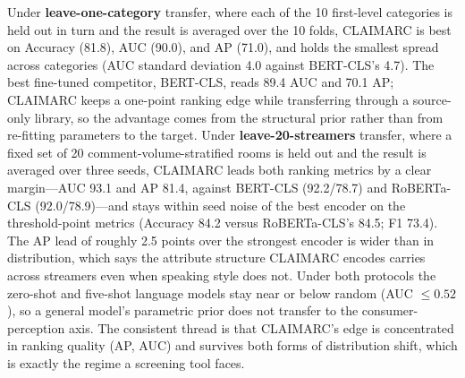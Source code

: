 \documentclass[11pt]{article}
\begin{document}
Under \textbf{leave-one-category} transfer, where each of the 10 first-level
categories is held out in turn and the result is averaged over the 10 folds,
CLAIMARC is best on Accuracy (81.8), AUC (90.0), and AP (71.0), and holds the
smallest spread across categories (AUC standard deviation 4.0 against
BERT-CLS's 4.7). The best fine-tuned competitor, BERT-CLS, reads 89.4 AUC and
70.1 AP; CLAIMARC keeps a one-point ranking edge while transferring through a
source-only library, so the advantage comes from the structural prior rather
than from re-fitting parameters to the target. Under
\textbf{leave-20-streamers} transfer, where a fixed set of 20
comment-volume-stratified rooms is held out and the result is averaged over
three seeds, CLAIMARC leads both ranking metrics by a clear margin---AUC 93.1
and AP 81.4, against BERT-CLS (92.2/78.7) and RoBERTa-CLS (92.0/78.9)---and stays
within seed noise of the best encoder on the threshold-point metrics (Accuracy
84.2 versus RoBERTa-CLS's 84.5; F1 73.4). The AP lead of roughly 2.5 points over
the strongest encoder is wider than in distribution, which says the attribute
structure CLAIMARC encodes carries across streamers even when speaking style does
not. Under both protocols the zero-shot and five-shot language models stay near
or below random (AUC $\le 0.52$), so a general model's parametric prior does not
transfer to the consumer-perception axis. The consistent thread is that
CLAIMARC's edge is concentrated in ranking quality (AP, AUC) and survives both
forms of distribution shift, which is exactly the regime a screening tool
faces.
\end{document}
